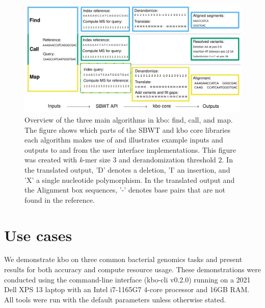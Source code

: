 \documentclass[unnumsec,webpdf,contemporary,large]{oup-authoring-template}%
\theoremstyle{thmstyleone}%
\theoremstyle{thmstyletwo}%
\theoremstyle{thmstylethree}%
\begin{document}
\begin{figure}[!t]%
\centering
\includegraphics{fig/kbo_overview.pdf}
\caption{Overview of the three main algorithms in {\sf kbo}: find, call, and map. The figure shows which parts of the SBWT and {\sf kbo} core libraries each algorithm makes use of and illustrates example inputs and outputs to and from the user interface implementations. This figure was created with \emph{k}-mer size $3$ and derandomization threshold $2$. In the translated output, 'D' denotes a deletion, 'I' an insertion, and 'X' a single nucleotide polymorphism. In the translated output and the Alignment box sequences, '-' denotes base pairs that are not found in the reference.}\label{fig:kbo-overview}
\end{figure}

\section{Use cases}
We demonstrate {\sf kbo} on three common bacterial genomics tasks and present results for both accuracy and compute resource usage. These demonstrations were conducted using the command-line interface (kbo-cli v0.2.0) running on a 2021 Dell XPS 13 laptop with an Intel i7-1165G7 4-core processor and 16GB RAM. All tools were run with the default parameters unless otherwise stated.
\end{document}
